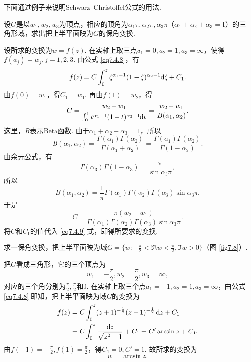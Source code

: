下面通过例子来说明Schwarz--Christoffel公式的用法.
\begin{example}\label{thm7.4.7}
设$G$是以$w_1,w_2,w_3$为顶点，相应的顶角为$\alpha_1\pi,\alpha_2\pi,\alpha_3\pi$（$\alpha_1+\alpha_2+\alpha_3=1$）的三角形域，求出把上半平面映为$G$的保角变换.
\end{example}
\begin{solution}
设所求的变换为$w=f(z)$. 在实轴上取三点$a_1=0,a_2=1,a_3=\infty$，使得$f(a_j)=w_j,j=1,2,3$. 由公式 \eqref{eq7.4.8}，有
\begin{equation}\label{eq7.4.9}
f(z)=C\int_0^z\zeta^{\alpha_1-1}(1-\zeta)^{\alpha_2-1}\textrm d\zeta+C_1.
\end{equation}
由$f(0)=w_1$，得$C_1=w_1$. 再由$f(1)=w_2$，得
\[C=\frac{w_2-w_1}{\int_0^1t^{\alpha_1-1}(1-t)^{\alpha_2-1}\textrm dt}
=\frac{w_2-w_1}{B(\alpha_1,\alpha_2)}.\]
这里，$B$表示Beta函数. 由于$\alpha_1+\alpha_2+\alpha_3=1$，所以
\[B(\alpha_1,\alpha_2)=\frac{\Gamma(\alpha_1)\Gamma(\alpha_2)}{\Gamma(\alpha_1+\alpha_2)}
=\frac{\Gamma(\alpha_1)\Gamma(\alpha_2)}{\Gamma(1-\alpha_3)}.\]
由余元公式，有
\[\Gamma(\alpha_3)\Gamma(1-\alpha_3)=\frac\pi{\sin\alpha_3\pi},\]
所以
\[B(\alpha_1,\alpha_2)=\frac1\pi\Gamma(\alpha_1)\Gamma(\alpha_2)
\Gamma(\alpha_3)\sin\alpha_3\pi.\]
于是
\[C=\frac{\pi(w_2-w_1)}{\Gamma(\alpha_1)\Gamma(\alpha_2)
\Gamma(\alpha_3)\sin\alpha_3\pi}.\]
将$C$和$C_1$的值代入 \eqref{eq7.4.9} 式，即得所要求的变换.
\end{solution}

\begin{example}\label{exam7.4.8}
求一保角变换，把上半平面映为域$G=\bigg\{w:-\frac\pi2<\Re w<\frac\pi2,\Im w>0\bigg\}$（图 \ref{fig7.8}）.
\end{example}
\noindent\begin{minipage}{0.6\textwidth}
\begin{solution}
把$G$看成三角形，它的三个顶点为
\[w_1=-\frac\pi2,w_2=\frac\pi2,w_3=\infty,\]
对应的三个角分别为$\frac\pi2,\frac\pi2$和$0$. 在实轴上取三个点$a_1=-1,a_2=1,a_3=\infty$，由公式 \eqref{eq7.4.8} 即知，把上半平面映为域$G$的变换为
\begin{align*}
f(z)&=C\int_0^z(z+1)^{-\frac12}(z-1)^{-\frac12}\mathop{}\!\mathrm dz+C_1\\
&=C\int_0^z\frac{\mathop{}\!\mathrm dz}{\sqrt{z^2-1}}+C_1=C'\arcsin z+C_1.
\end{align*}
由$f(-1)=-\frac\pi2,f(1)=\frac\pi2$，得$C_1=0,C'=1$. 故所求的变换为
\begin{equation*}
w=\arcsin z.
\end{equation*}
\end{solution}
\end{minipage}%
\begin{minipage}{0.4\textwidth}
\centering
{}
\end{minipage}

